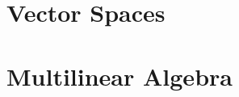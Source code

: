 \documentclass[../../../deep-dive]{subfiles}
\begin{document}
\chapter{Vector Spaces}










\chapter{Multilinear Algebra}






\end{document}
